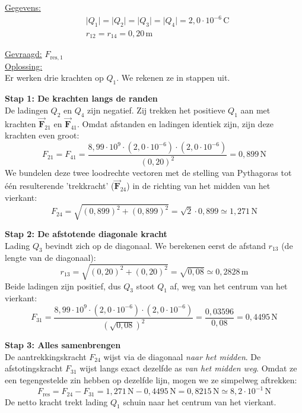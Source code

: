 \documentclass{ximera}
\begin{document}
\begin{exercise}
\begin{question}
        \begin{solution}\nl
            \underline{Gegevens:}
            \begin{align*}
                & \lvert Q_{1} \rvert = \lvert Q_{2} \rvert = \lvert Q_{3} \rvert = \lvert Q_{4} \rvert = 2{,}0 \cdot 10^{-6} \, \mathrm{C} \\
                & r_{12} = r_{14} = 0{,}20 \, \mathrm{m}
            \end{align*}
    
            \underline{Gevraagd:} $F_{\text{res},1}$\\ 
    
            \underline{Oplossing:}\\
            Er werken drie krachten op $Q_1$. We rekenen ze in stappen uit.
            
            \textbf{Stap 1: De krachten langs de randen}\\
            De ladingen $Q_2$ en $Q_4$ zijn negatief. Zij trekken het positieve $Q_1$ aan met krachten $\vec{\mathbf{F}}_{21}$ en $\vec{\mathbf{F}}_{41}$. Omdat afstanden en ladingen identiek zijn, zijn deze krachten even groot:
            \[
                F_{21} = F_{41} = \frac{8{,}99 \cdot 10^9 \cdot (2{,}0 \cdot 10^{-6}) \cdot (2{,}0 \cdot 10^{-6})}{(0{,}20)^2} = 0{,}899 \, \mathrm{N}
            \]
            We bundelen deze twee loodrechte vectoren met de stelling van Pythagoras tot één resulterende 'trekkracht' ($\vec{\mathbf{F}}_{24}$) in de richting van het midden van het vierkant:
            \[
                F_{24} = \sqrt{(0{,}899)^2 + (0{,}899)^2} = \sqrt{2} \cdot 0{,}899 \simeq 1{,}271 \, \mathrm{N}
            \]
            
            \textbf{Stap 2: De afstotende diagonale kracht}\\
            Lading $Q_3$ bevindt zich op de diagonaal. We berekenen eerst de afstand $r_{13}$ (de lengte van de diagonaal):
            \[
                r_{13} = \sqrt{(0{,}20)^2 + (0{,}20)^2} = \sqrt{0{,}08} \simeq 0{,}2828 \, \mathrm{m}
            \]
            Beide ladingen zijn positief, dus $Q_3$ stoot $Q_1$ af, weg van het centrum van het vierkant:
            \[
                F_{31} = \frac{8{,}99 \cdot 10^9 \cdot (2{,}0 \cdot 10^{-6}) \cdot (2{,}0 \cdot 10^{-6})}{(\sqrt{0{,}08})^2} = \frac{0{,}03596}{0{,}08} = 0{,}4495 \, \mathrm{N}
            \]

            \textbf{Stap 3: Alles samenbrengen}\\
            De aantrekkingskracht $F_{24}$ wijst via de diagonaal \emph{naar het midden}.
            De afstotingskracht $F_{31}$ wijst langs exact dezelfde as \emph{van het midden weg}.
            Omdat ze een tegengestelde zin hebben op dezelfde lijn, mogen we ze simpelweg aftrekken:
            \[
                F_{\text{res}} = F_{24} - F_{31} = 1{,}271 \, \mathrm{N} - 0{,}4495 \, \mathrm{N} = 0{,}8215 \, \mathrm{N} \simeq 8{,}2 \cdot 10^{-1} \, \mathrm{N}
            \]
            De netto kracht trekt lading $Q_1$ schuin naar het centrum van het vierkant.
        \end{solution}
    \end{question}
\end{exercise}
\end{document}
